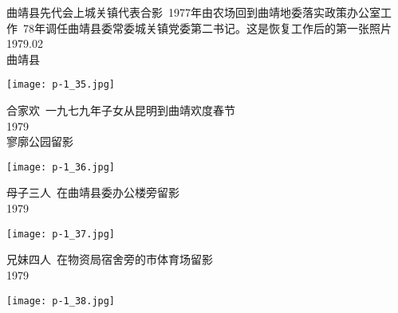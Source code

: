 \begin{tcolorbox}[notitle,grow to right by=1in,boxrule=0pt,colback=DarkRed,colframe=DarkRed]
    \fontsize{1cm}{0.9cm}\selectfont
    \raggedleft
    \noindent
    曲靖县先代会上城关镇代表合影~1977年由农场回到曲靖地委落实政策办公室工作~78年调任曲靖县委常委城关镇党委第二书记。这是恢复工作后的第一张照片\\
    \Large
    1979.02\\
    曲靖县
\end{tcolorbox}
\begin{center}
    \texttt{[image: p-1\_35.jpg]}
\end{center}
\clearpage


\begin{tcolorbox}[notitle,grow to right by=1in,boxrule=0pt,colback=DarkRed,colframe=DarkRed]
    \fontsize{1cm}{0.9cm}\selectfont
    \raggedleft
    \noindent
    合家欢~一九七九年子女从昆明到曲靖欢度春节\\
    \Large
    1979\\
    寥廓公园留影
\end{tcolorbox}
\begin{center}
    \texttt{[image: p-1\_36.jpg]}
\end{center}
\clearpage


\begin{tcolorbox}[notitle,grow to right by=1in,boxrule=0pt,colback=DarkRed,colframe=DarkRed]
    \fontsize{1cm}{0.9cm}\selectfont
    \raggedleft
    \noindent
    母子三人~在曲靖县委办公楼旁留影\\
    \Large
    1979\\
    
\end{tcolorbox}
\begin{center}
    \texttt{[image: p-1\_37.jpg]}
\end{center}
\clearpage


\begin{tcolorbox}[notitle,grow to right by=1in,boxrule=0pt,colback=DarkRed,colframe=DarkRed]
    \fontsize{1cm}{0.9cm}\selectfont
    \raggedleft
    \noindent
    兄妹四人~在物资局宿舍旁的市体育场留影\\
    \Large
    1979\\
    
\end{tcolorbox}
\begin{center}
    \texttt{[image: p-1\_38.jpg]}
\end{center}
\clearpage



